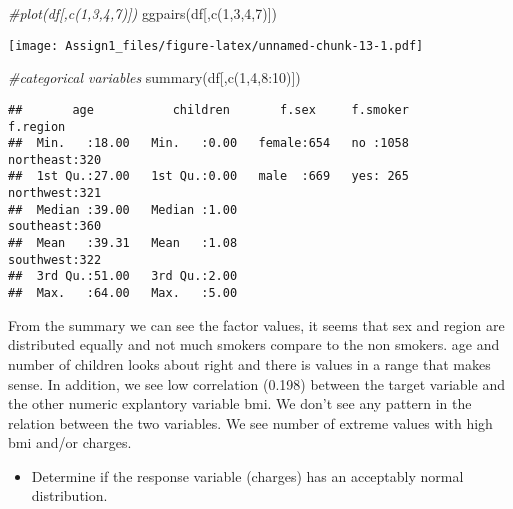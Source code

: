 \documentclass[
]{article}
\newenvironment{Shaded}{\begin{snugshade}}{\end{snugshade}}
\newcommand{\AttributeTok}[1]{\textcolor[rgb]{0.77,0.63,0.00}{#1}}
\newcommand{\CommentTok}[1]{\textcolor[rgb]{0.56,0.35,0.01}{\textit{#1}}}
\newcommand{\DecValTok}[1]{\textcolor[rgb]{0.00,0.00,0.81}{#1}}
\newcommand{\FunctionTok}[1]{\textcolor[rgb]{0.00,0.00,0.00}{#1}}
\newcommand{\NormalTok}[1]{#1}
\newcommand{\SpecialCharTok}[1]{\textcolor[rgb]{0.00,0.00,0.00}{#1}}
\newcommand{\StringTok}[1]{\textcolor[rgb]{0.31,0.60,0.02}{#1}}
\providecommand{\tightlist}{%
  \setlength{\itemsep}{0pt}\setlength{\parskip}{0pt}}
\begin{document}
\begin{Shaded}
\begin{Highlighting}[]
\CommentTok{\#plot(df[,c(1,3,4,7)])}
\FunctionTok{ggpairs}\NormalTok{(df[,}\FunctionTok{c}\NormalTok{(}\DecValTok{1}\NormalTok{,}\DecValTok{3}\NormalTok{,}\DecValTok{4}\NormalTok{,}\DecValTok{7}\NormalTok{)])}
\end{Highlighting}
\end{Shaded}

\texttt{[image: Assign1\_files/figure-latex/unnamed-chunk-13-1.pdf]}

\begin{Shaded}
\begin{Highlighting}[]
\CommentTok{\#categorical variables}
\FunctionTok{summary}\NormalTok{(df[,}\FunctionTok{c}\NormalTok{(}\DecValTok{1}\NormalTok{,}\DecValTok{4}\NormalTok{,}\DecValTok{8}\SpecialCharTok{:}\DecValTok{10}\NormalTok{)])}
\end{Highlighting}
\end{Shaded}

\begin{verbatim}
##       age           children       f.sex     f.smoker        f.region  
##  Min.   :18.00   Min.   :0.00   female:654   no :1058   northeast:320  
##  1st Qu.:27.00   1st Qu.:0.00   male  :669   yes: 265   northwest:321  
##  Median :39.00   Median :1.00                           southeast:360  
##  Mean   :39.31   Mean   :1.08                           southwest:322  
##  3rd Qu.:51.00   3rd Qu.:2.00                                          
##  Max.   :64.00   Max.   :5.00
\end{verbatim}

From the summary we can see the factor values, it seems that sex and
region are distributed equally and not much smokers compare to the non
smokers. age and number of children looks about right and there is
values in a range that makes sense. In addition, we see low correlation
(0.198) between the target variable and the other numeric explantory
variable bmi. We don't see any pattern in the relation between the two
variables. We see number of extreme values with high bmi and/or charges.

\begin{itemize}
\tightlist
\item
  Determine if the response variable (charges) has an acceptably normal
  distribution.
\end{itemize}

\begin{Shaded}
\end{Shaded}
\end{document}
